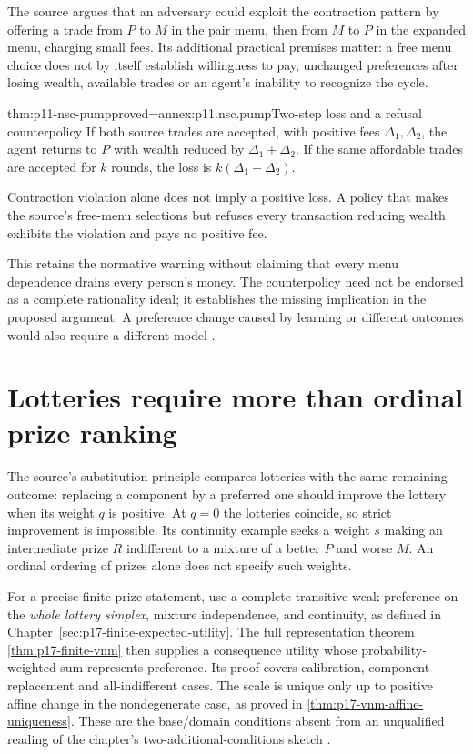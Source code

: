 The source argues that an adversary could exploit the contraction pattern
by offering a trade from \(P\) to \(M\) in the pair menu, then from
\(M\) to \(P\) in the expanded menu, charging small fees. Its
additional practical premises matter: a free menu choice does not by
itself establish willingness to pay, unchanged preferences after losing
wealth, available trades or an agent's inability to recognize the cycle.

\begin{hbtheorem}{thm:p11-nsc-pump}{proved=annex:p11.nsc.pump}{Two-step loss and a refusal counterpolicy}
If both source trades are accepted, with positive fees
\(\Delta_1,\Delta_2\), the agent returns to \(P\) with wealth reduced
by \(\Delta_1+\Delta_2\). If the same affordable trades are accepted
for \(k\) rounds, the loss is \(k(\Delta_1+\Delta_2)\).

Contraction violation alone does not imply a positive loss. A policy
that makes the source's free-menu selections but refuses every transaction
reducing wealth exhibits the violation and pays no positive fee.
\end{hbtheorem}

This retains the normative warning without claiming that every menu
dependence drains every person's money. The counterpolicy need not be
endorsed as a complete rationality ideal; it establishes the missing
implication in the proposed argument. A preference change caused by
learning or different outcomes would also require a different model
\cite[p.~17]{ChaterOaksford2012NormativeSystems}.

\section{Lotteries require more than ordinal prize ranking}
\label{sec:p11-nsc-lotteries}

The source's substitution principle compares lotteries with the same
remaining outcome: replacing a component by a preferred one should
improve the lottery when its weight \(q\) is positive. At \(q=0\)
the lotteries coincide, so strict improvement is impossible. Its continuity
example seeks a weight \(s\) making an intermediate prize \(R\)
indifferent to a mixture of a better \(P\) and worse \(M\).
An ordinal ordering of prizes alone does not specify such weights.

For a precise finite-prize statement, use a complete transitive weak
preference on the \emph{whole lottery simplex}, mixture independence,
and continuity, as defined in Chapter~\ref{sec:p17-finite-expected-utility}.
The full representation theorem \ref{thm:p17-finite-vnm} then supplies
a consequence utility whose probability-weighted sum represents preference.
Its proof covers calibration, component replacement and all-indifferent
cases. The scale is unique only up to positive affine change in the
nondegenerate case, as proved in \ref{thm:p17-vnm-affine-uniqueness}.
These are the base/domain conditions absent from an unqualified reading
of the chapter's two-additional-conditions sketch
\cite[p.~17]{ChaterOaksford2012NormativeSystems}.


